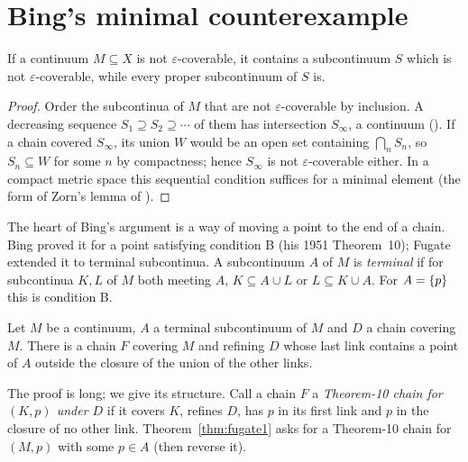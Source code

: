 
\section{Bing's minimal counterexample}

\begin{lemma}\label{lem:brouwer}
If a continuum $M\subseteq X$ is not $\varepsilon$-coverable, it contains a subcontinuum $S$ which is not $\varepsilon$-coverable, while every proper
subcontinuum of $S$ is.
\end{lemma}

\begin{proof}
Order the subcontinua of $M$ that are not $\varepsilon$-coverable by inclusion. A decreasing sequence $S_1\supseteq S_2\supseteq\cdots$ of them has
intersection $S_\infty$, a continuum (). If a chain covered $S_\infty$, its union $W$ would be an open set containing
$\bigcap_nS_n$, so $S_n\subseteq W$ for some $n$ by compactness; hence $S_\infty$ is not $\varepsilon$-coverable either. In a compact metric space this
sequential condition suffices for a minimal element (the form of Zorn's lemma of ).
\end{proof}


The heart of Bing's argument is a way of moving a point to the end of a chain. Bing proved it for a point satisfying condition B (his 1951 Theorem~10);
Fugate extended it to terminal subcontinua. A subcontinuum $A$ of $M$ is \emph{terminal} if for subcontinua $K,L$ of $M$ both meeting $A$,
$K\subseteq A\cup L$ or $L\subseteq K\cup A$. For $A=\left\{ p \right\}$ this is condition B.


\begin{theorem}\label{thm:fugate1}
Let $M$ be a continuum, $A$ a terminal subcontinuum of $M$ and $D$ a chain covering $M$. There is a chain $F$ covering $M$ and refining $D$ whose last link
contains a point of $A$ outside the closure of the union of the other links.
\end{theorem}

The proof is long; we give its structure. Call a chain $F$ a \emph{Theorem-10 chain for $(K,p)$ under $D$} if it covers $K$, refines $D$, has $p$ in its
first link and $p$ in the closure of no other link. Theorem~\ref{thm:fugate1} asks for a Theorem-10 chain for $(M,p)$ with some $p\in A$ (then reverse it).

